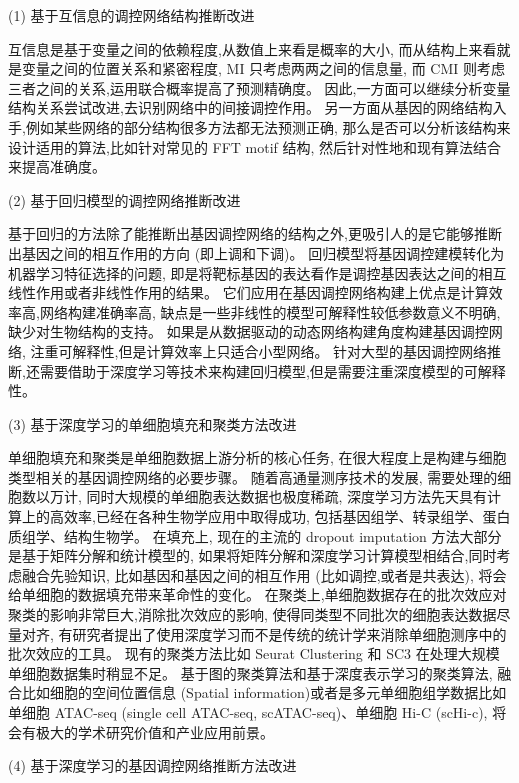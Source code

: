 (1) 基于互信息的调控网络结构推断改进

互信息是基于变量之间的依赖程度,从数值上来看是概率的大小,
而从结构上来看就是变量之间的位置关系和紧密程度, MI 只考虑两两之间的信息量,
而 CMI 则考虑三者之间的关系,运用联合概率提高了预测精确度。
因此,一方面可以继续分析变量结构关系尝试改进,去识别网络中的间接调控作用。
另一方面从基因的网络结构入手,例如某些网络的部分结构很多方法都无法预测正确,
那么是否可以分析该结构来设计适用的算法,比如针对常见的 FFT motif 结构, 
然后针对性地和现有算法结合来提高准确度。

(2) 基于回归模型的调控网络推断改进

基于回归的方法除了能推断出基因调控网络的结构之外,更吸引人的是它能够推断出基因之间的相互作用的方向 (即上调和下调)。
回归模型将基因调控建模转化为机器学习特征选择的问题,
即是将靶标基因的表达看作是调控基因表达之间的相互线性作用或者非线性作用的结果。
它们应用在基因调控网络构建上优点是计算效率高,网络构建准确率高,
缺点是一些非线性的模型可解释性较低参数意义不明确,缺少对生物结构的支持。
如果是从数据驱动的动态网络构建角度构建基因调控网络, 注重可解释性,但是计算效率上只适合小型网络。
针对大型的基因调控网络推断,还需要借助于深度学习等技术来构建回归模型,但是需要注重深度模型的可解释性。

(3) 基于深度学习的单细胞填充和聚类方法改进

单细胞填充和聚类是单细胞数据上游分析的核心任务, 
在很大程度上是构建与细胞类型相关的基因调控网络的必要步骤。
随着高通量测序技术的发展, 需要处理的细胞数以万计, 同时大规模的单细胞表达数据也极度稀疏,
深度学习方法先天具有计算上的高效率,已经在各种生物学应用中取得成功,
包括基因组学、转录组学、蛋白质组学、结构生物学。
在填充上, 现在的主流的 dropout imputation 方法大部分是基于矩阵分解和统计模型的,
如果将矩阵分解和深度学习计算模型相结合,同时考虑融合先验知识,
比如基因和基因之间的相互作用 (比如调控,或者是共表达),
将会给单细胞的数据填充带来革命性的变化。
在聚类上,单细胞数据存在的批次效应对聚类的影响非常巨大,消除批次效应的影响,
使得同类型不同批次的细胞表达数据尽量对齐,
有研究者提出了使用深度学习而不是传统的统计学来消除单细胞测序中的批次效应的工具。
现有的聚类方法比如 Seurat Clustering  和 SC3  在处理大规模单细胞数据集时稍显不足。
基于图的聚类算法和基于深度表示学习的聚类算法,
融合比如细胞的空间位置信息 (Spatial information)或者是多元单细胞组学数据比如
单细胞 ATAC-seq (single cell ATAC-seq, scATAC-seq)、单细胞 Hi-C (scHi-c), 
将会有极大的学术研究价值和产业应用前景。

(4) 基于深度学习的基因调控网络推断方法改进

